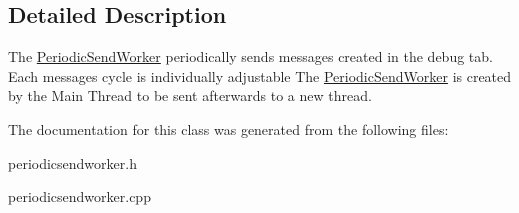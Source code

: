\subsection{Detailed Description}
The \hyperlink{class_periodic_send_worker}{Periodic\+Send\+Worker} periodically sends messages created in the debug tab. Each message\textquotesingle{}s cycle is individually adjustable The \hyperlink{class_periodic_send_worker}{Periodic\+Send\+Worker} is created by the Main Thread to be sent afterwards to a new thread. 

The documentation for this class was generated from the following files\+:\begin{DoxyCompactItemize}
\item 
periodicsendworker.\+h\item 
periodicsendworker.\+cpp\end{DoxyCompactItemize}
